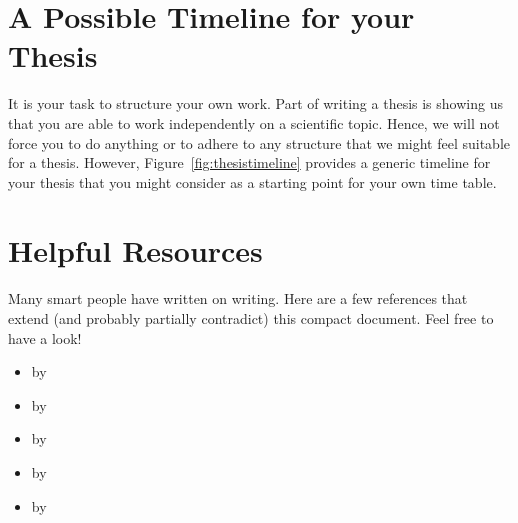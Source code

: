 \documentclass[logo, twocolumn]{mlai-report}
\begin{document}
\section{A Possible Timeline for your Thesis}

It is your task to structure your own work. 
Part of writing a thesis is showing us that you are able to work independently on a scientific topic. 
Hence, we will not force you to do anything or to adhere to any structure that we might feel suitable for a thesis. 
However, Figure~\ref{fig:thesistimeline} provides a generic timeline for your thesis that you might consider as a starting point for your own time table.






\begin{sidewaysfigure}

  \resizebox{\textheight}{!}{
    
  }

  \caption{A possible timeline of your thesis.}
  \label{fig:thesistimeline}
\end{sidewaysfigure}



\section{Helpful Resources} \label{sec:helpful-resources} 

Many smart people have written on writing. 
Here are a few references that extend (and probably partially contradict) this compact document.
Feel free to have a look!

\begin{itemize}
       \item {} by \textcite{keshav_how_to_read}
       \item {} by \textcite{zobel_writing}
       \item {} by \textcite{knuth_mathematical_writing}
       \item {} by \textcite{winston_how_to_speak}
       \item {} by \textcite{strunkwhite}
\end{itemize}{}
\end{document}

